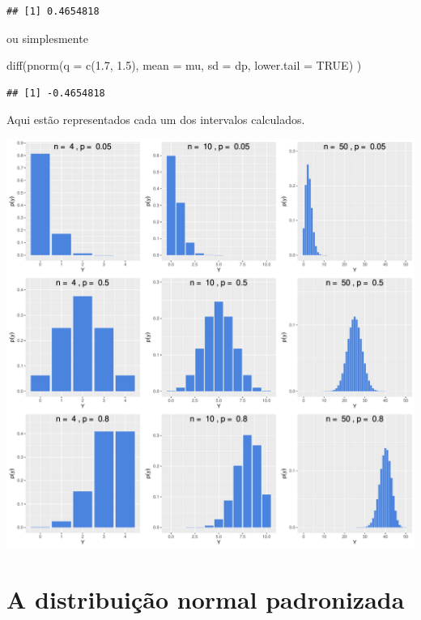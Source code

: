 \documentclass[
]{book}
\newenvironment{Shaded}{\begin{snugshade}}{\end{snugshade}}
\newcommand{\AttributeTok}[1]{\textcolor[rgb]{0.77,0.63,0.00}{#1}}
\newcommand{\ConstantTok}[1]{\textcolor[rgb]{0.00,0.00,0.00}{#1}}
\newcommand{\FloatTok}[1]{\textcolor[rgb]{0.00,0.00,0.81}{#1}}
\newcommand{\FunctionTok}[1]{\textcolor[rgb]{0.00,0.00,0.00}{#1}}
\newcommand{\NormalTok}[1]{#1}
\begin{document}
\begin{verbatim}
## [1] 0.4654818
\end{verbatim}

ou simplesmente

\begin{Shaded}
\begin{Highlighting}[]
\FunctionTok{diff}\NormalTok{(}\FunctionTok{pnorm}\NormalTok{(}\AttributeTok{q =} \FunctionTok{c}\NormalTok{(}\FloatTok{1.7}\NormalTok{, }\FloatTok{1.5}\NormalTok{),}
           \AttributeTok{mean =}\NormalTok{ mu,}
           \AttributeTok{sd =}\NormalTok{ dp,}
           \AttributeTok{lower.tail =} \ConstantTok{TRUE}\NormalTok{)}
\NormalTok{     )}
\end{Highlighting}
\end{Shaded}

\begin{verbatim}
## [1] -0.4654818
\end{verbatim}

Aqui estão representados cada um dos intervalos calculados.

\begin{center}\includegraphics{probest-cambientais_files/figure-latex/unnamed-chunk-198-1} \end{center}

\hypertarget{a-distribuiuxe7uxe3o-normal-padronizada}{%
\section{A distribuição normal padronizada}\label{a-distribuiuxe7uxe3o-normal-padronizada}}
\end{document}
